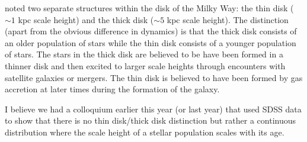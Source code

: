  noted two separate structures within the disk of the
Milky Way: the thin disk ($\sim1$ kpc scale height) and the thick disk
($\sim5$ kpc scale height).  The distinction (apart from the obvious difference in dynamics)
is that the thick disk consists of an older population of stars while the thin disk consists
of a younger population of stars.
The stars in the thick disk are believed to be have been formed in a thinner disk and then
excited to larger scale heights through encounters with satellite galaxies or mergers.
The thin disk is believed to have been formed by gas
accretion at later times during the formation of the galaxy.

I believe we had a colloquium earlier this year (or last year) that used SDSS data to show
that there is no thin disk/thick disk distinction but rather a continuous distribution
where the scale height of a stellar population scales with its age.


